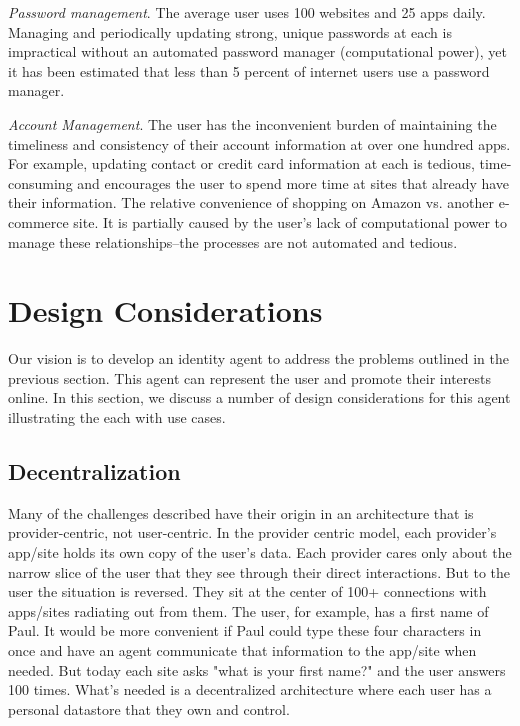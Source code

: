 \documentclass[11pt, oneside]{article}   	%
\begin{document}
\emph{Password management}. The average user uses 100 websites and 25 apps daily. Managing and periodically updating strong, unique passwords at each is  impractical without an automated password manager (computational power), yet it has been estimated that less than 5 percent of internet users use a password manager. 

\emph{Account Management}. The user has the inconvenient burden of maintaining the timeliness and consistency of their account information at over one hundred apps. For example, updating contact or credit card information at each is tedious, time-consuming and encourages the user to spend more time at sites that already have their information. The relative convenience of shopping on Amazon vs. another e-commerce site. It is partially caused by the user's lack of computational power to manage these relationships--the processes are not automated and tedious.

\section{Design Considerations}
Our vision is to develop an identity agent to address the problems outlined in the previous section. This agent  can represent the user and promote their interests online. In this section, we discuss a number of design considerations for this agent illustrating the each with use cases.

\subsection{Decentralization}

Many of the challenges described have their origin in an architecture that is provider-centric, not user-centric. In the provider centric model, each provider's app/site holds its own copy of the user's data. Each provider cares only about the narrow slice of the user that they see through their direct interactions. But to the user the situation is reversed. They sit at the center of 100+ connections with apps/sites radiating out from them. The user, for example, has a first name of Paul. It would be more convenient if Paul could type these four characters in once and have an agent communicate that information to the app/site when needed. But today each site asks "what is your first name?" and the user answers 100 times. What's needed is a decentralized architecture where each user has a personal datastore that they own and control. 
\end{document}
